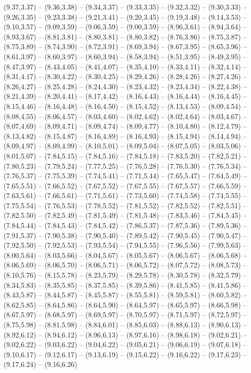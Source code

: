 \expandafter\def\csname geo:gebiet:CZE\endcsname{
  (9.37,3.37) -- (9.36,3.38) -- (9.34,3.37) -- (9.33,3.35) -- (9.32,3.32) -- (9.30,3.33) -- (9.26,3.35) -- (9.23,3.38) -- (9.21,3.41) -- (9.20,3.45) -- (9.19,3.48) -- (9.14,3.53) -- (9.10,3.57) -- (9.09,3.59) -- (9.06,3.59) -- (9.00,3.59) -- (8.96,3.61) -- (8.94,3.64) -- (8.93,3.67) -- (8.81,3.81) -- (8.80,3.81) -- (8.80,3.82) -- (8.76,3.86) -- (8.75,3.87) -- (8.75,3.89) -- (8.74,3.90) -- (8.72,3.91) -- (8.69,3.94) -- (8.67,3.95) -- (8.65,3.96) -- (8.61,3.97) -- (8.60,3.97) -- (8.60,3.94) -- (8.58,3.94) -- (8.51,3.95) -- (8.49,3.95) -- (8.47,3.97) -- (8.43,4.05) -- (8.41,4.07) -- (8.35,4.10) -- (8.33,4.11) -- (8.32,4.14) -- (8.31,4.17) -- (8.30,4.22) -- (8.30,4.25) -- (8.29,4.26) -- (8.28,4.26) -- (8.27,4.26) -- (8.26,4.27) -- (8.25,4.28) -- (8.24,4.30) -- (8.23,4.32) -- (8.23,4.34) -- (8.22,4.38) -- (8.21,4.39) -- (8.20,4.41) -- (8.17,4.42) -- (8.16,4.43) -- (8.16,4.44) -- (8.16,4.45) -- (8.15,4.46) -- (8.16,4.48) -- (8.16,4.50) -- (8.15,4.52) -- (8.13,4.53) -- (8.09,4.54) -- (8.08,4.55) -- (8.06,4.57) -- (8.03,4.60) -- (8.02,4.62) -- (8.02,4.64) -- (8.03,4.67) -- (8.07,4.69) -- (8.09,4.71) -- (8.09,4.74) -- (8.09,4.77) -- (8.10,4.80) -- (8.12,4.79) -- (8.13,4.82) -- (8.15,4.87) -- (8.16,4.89) -- (8.16,4.93) -- (8.15,4.94) -- (8.14,4.94) -- (8.09,4.97) -- (8.09,4.99) -- (8.10,5.01) -- (8.09,5.04) -- (8.07,5.05) -- (8.03,5.06) -- (8.01,5.07) -- (7.84,5.15) -- (7.84,5.16) -- (7.84,5.18) -- (7.83,5.20) -- (7.82,5.21) -- (7.80,5.23) -- (7.79,5.24) -- (7.77,5.25) -- (7.76,5.28) -- (7.76,5.30) -- (7.76,5.34) -- (7.76,5.37) -- (7.75,5.39) -- (7.74,5.41) -- (7.71,5.44) -- (7.65,5.47) -- (7.64,5.49) -- (7.65,5.51) -- (7.66,5.52) -- (7.67,5.52) -- (7.67,5.55) -- (7.67,5.57) -- (7.66,5.59) -- (7.63,5.61) -- (7.66,5.61) -- (7.71,5.61) -- (7.73,5.60) -- (7.74,5.58) -- (7.74,5.55) -- (7.75,5.54) -- (7.76,5.53) -- (7.78,5.52) -- (7.81,5.52) -- (7.82,5.52) -- (7.82,5.51) -- (7.82,5.50) -- (7.82,5.49) -- (7.81,5.49) -- (7.81,5.48) -- (7.83,5.46) -- (7.84,5.45) -- (7.84,5.44) -- (7.84,5.43) -- (7.84,5.42) -- (7.86,5.37) -- (7.87,5.36) -- (7.89,5.36) -- (7.91,5.37) -- (7.90,5.38) -- (7.90,5.40) -- (7.89,5.42) -- (7.90,5.45) -- (7.90,5.47) -- (7.92,5.50) -- (7.92,5.53) -- (7.93,5.54) -- (7.94,5.55) -- (7.96,5.56) -- (7.99,5.63) -- (8.00,5.64) -- (8.03,5.66) -- (8.04,5.67) -- (8.05,5.67) -- (8.06,5.67) -- (8.06,5.68) -- (8.06,5.69) -- (8.06,5.70) -- (8.06,5.71) -- (8.06,5.72) -- (8.07,5.72) -- (8.08,5.73) -- (8.10,5.76) -- (8.15,5.78) -- (8.23,5.79) -- (8.29,5.78) -- (8.30,5.78) -- (8.32,5.79) -- (8.34,5.83) -- (8.35,5.85) -- (8.37,5.85) -- (8.39,5.86) -- (8.41,5.85) -- (8.41,5.86) -- (8.43,5.87) -- (8.44,5.87) -- (8.45,5.87) -- (8.55,5.81) -- (8.59,5.81) -- (8.60,5.82) -- (8.62,5.85) -- (8.64,5.86) -- (8.64,5.90) -- (8.64,5.97) -- (8.65,5.97) -- (8.66,5.98) -- (8.67,5.97) -- (8.68,5.97) -- (8.69,5.97) -- (8.70,5.97) -- (8.71,5.97) -- (8.72,5.97) -- (8.75,5.98) -- (8.81,5.98) -- (8.84,6.01) -- (8.85,6.03) -- (8.88,6.13) -- (8.90,6.13) -- (8.92,6.12) -- (8.94,6.12) -- (8.96,6.13) -- (8.97,6.16) -- (8.98,6.18) -- (9.02,6.21) -- (9.02,6.22) -- (9.03,6.22) -- (9.04,6.22) -- (9.05,6.21) -- (9.06,6.19) -- (9.07,6.18) -- (9.10,6.17) -- (9.12,6.17) -- (9.13,6.19) -- (9.15,6.22) -- (9.16,6.22) -- (9.17,6.23) -- (9.17,6.24) -- (9.16,6.26) }
